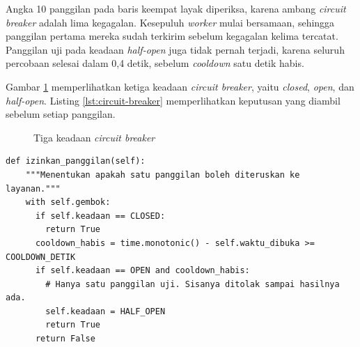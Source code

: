 Angka 10 panggilan pada baris keempat layak diperiksa, karena ambang
\textit{circuit breaker} adalah lima kegagalan. Kesepuluh \textit{worker} mulai
bersamaan, sehingga panggilan pertama mereka sudah terkirim sebelum kegagalan
kelima tercatat. Panggilan uji pada keadaan \textit{half-open} juga tidak pernah
terjadi, karena seluruh percobaan selesai dalam 0,4 detik, sebelum
\textit{cooldown} satu detik habis.

Gambar \ref{fig:circuit-breaker} memperlihatkan ketiga keadaan
\textit{circuit breaker}, yaitu \textit{closed}, \textit{open}, dan
\textit{half-open}. Listing \ref{lst:circuit-breaker} memperlihatkan keputusan yang
diambil sebelum setiap panggilan.

\begin{figure}[!htb]
  \centering
  \caption{Tiga keadaan \textit{circuit breaker}}
  \label{fig:circuit-breaker}
\end{figure}

\begin{lstlisting}[style=PythonStyle, caption={Keputusan \textit{circuit breaker} sebelum setiap panggilan, tersedia di \berkas{sources/chapter04/resilience.py}}, label={lst:circuit-breaker}]
  def izinkan_panggilan(self):
    """Menentukan apakah satu panggilan boleh diteruskan ke layanan."""
    with self.gembok:
      if self.keadaan == CLOSED:
        return True
      cooldown_habis = time.monotonic() - self.waktu_dibuka >= COOLDOWN_DETIK
      if self.keadaan == OPEN and cooldown_habis:
        # Hanya satu panggilan uji. Sisanya ditolak sampai hasilnya ada.
        self.keadaan = HALF_OPEN
        return True
      return False
\end{lstlisting}

